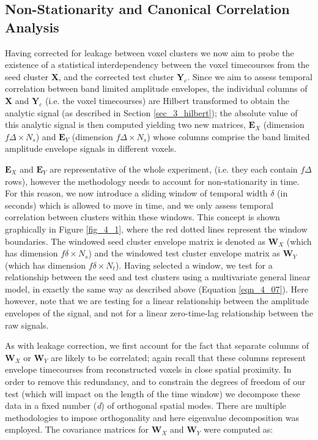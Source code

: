 \subsection{Non-Stationarity and Canonical Correlation Analysis}
Having corrected for leakage between voxel clusters we now aim to probe the existence of a statistical interdependency between the voxel timecourses from the seed cluster \textbf{X}, and the corrected test cluster $\mathbf{Y}_c$. Since we aim to assess temporal correlation between band limited amplitude envelopes, the individual columns of \textbf{X} and $\mathbf{Y}_c$ (i.e. the voxel timecourses) are Hilbert transformed to obtain the analytic signal (as described in Section \ref{sec_3_hilbert}); the absolute value of this analytic signal is then computed yielding two new matrices, $\mathbf{E}_X$ (dimension $f\Delta\times N_s$) and $\mathbf{E}_Y$ (dimension $f\Delta\times N_s$) whose columns comprise the band limited amplitude envelope signals in different voxels.

$\mathbf{E}_X$ and $\mathbf{E}_Y$ are representative of the whole experiment, (i.e. they each contain $f\Delta$ rows), however the methodology needs to account for non-stationarity in time. For this reason, we now introduce a sliding window of temporal width $\delta$ (in seconds) which is allowed to move in time, and we only assess temporal correlation between clusters within these windows. This concept is shown graphically in Figure \ref{fig_4_1}, where the red dotted lines represent the window boundaries. The windowed seed cluster envelope matrix is denoted as $\mathbf{W}_X$  (which has dimension $f\delta\times N_s$) and the windowed test cluster envelope matrix as $\mathbf{W}_Y$ (which has dimension $f\delta\times N_t$). Having selected a window, we test for a relationship between the seed and test clusters using a multivariate general linear model, in exactly the same way as described above (Equation \ref{eqn_4_07}). Here however, note that we are testing for a linear relationship between the amplitude envelopes of the signal, and not for a linear zero-time-lag relationship between the raw signals. 

As with leakage correction, we first account for the fact that separate columns of $\mathbf{W}_X$ or $\mathbf{W}_Y$ are likely to be correlated; again recall that these columns represent envelope timecourses from reconstructed voxels in close spatial proximity. In order to remove this redundancy, and to constrain the degrees of freedom of our test (which will impact on the length of the time window) we decompose these data in a fixed number (\textit{d}) of orthogonal spatial modes.  There are multiple methodologies to impose orthogonality and here eigenvalue decomposition was employed. The covariance matrices for $\mathbf{W}_X$ and $\mathbf{W}_Y$ were computed as:


